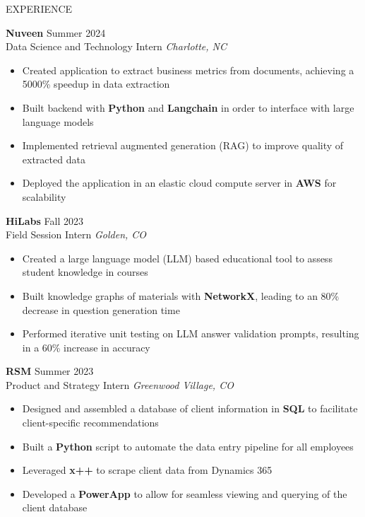 \documentclass{resume} %
\begin{document}
\begin{rSection}{EXPERIENCE}

\textbf{Nuveen} \hfill Summer 2024\\
Data Science and Technology Intern \hfill \textit{Charlotte, NC}
\vspace{-6pt}
 \begin{itemize}[leftmargin=*]
    \itemsep -6pt {} 
    \item Created application to extract business metrics from documents, achieving a 5000\% speedup in data extraction
    \item Built backend with \textbf{Python} and \textbf{Langchain} in order to interface with large language models
    \item Implemented retrieval augmented generation (RAG) to improve quality of extracted data
    \item Deployed the application in an elastic cloud compute server in \textbf{AWS} for scalability
 \end{itemize}

 \textbf{HiLabs} \hfill Fall 2023\\
Field Session Intern \hfill \textit{Golden, CO}
\vspace{-6pt}
 \begin{itemize}[leftmargin=*]
    \itemsep -6pt {} 
    \item Created a large language model (LLM) based educational tool to assess student knowledge in courses
    \item Built knowledge graphs of materials with \textbf{NetworkX}, leading to an 80\% decrease in question generation time
    \item Performed iterative unit testing on LLM answer validation prompts, resulting in a 60\% increase in accuracy
 \end{itemize}

\textbf{RSM} \hfill Summer 2023\\
Product and Strategy Intern \hfill \textit{Greenwood Village, CO}
\vspace{-6pt}
 \begin{itemize}[leftmargin=*]
    \itemsep -6pt {} 
     \item Designed and assembled a database of client information in \textbf{SQL} to facilitate client-specific recommendations 
     \item Built a \textbf{Python} script to automate the data entry pipeline for all employees
     \item Leveraged \textbf{x++} to scrape client data from Dynamics 365
     \item Developed a \textbf{PowerApp} to allow for seamless viewing and querying of the client database
 \end{itemize}

\end{rSection}
 
\end{document}
